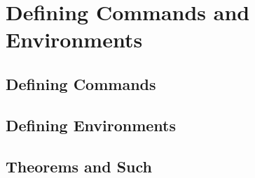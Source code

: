\section{Defining Commands and Environments}
\subsection{Defining Commands}


\subsection{Defining Environments}


\subsection{Theorems and Such}
\newpage